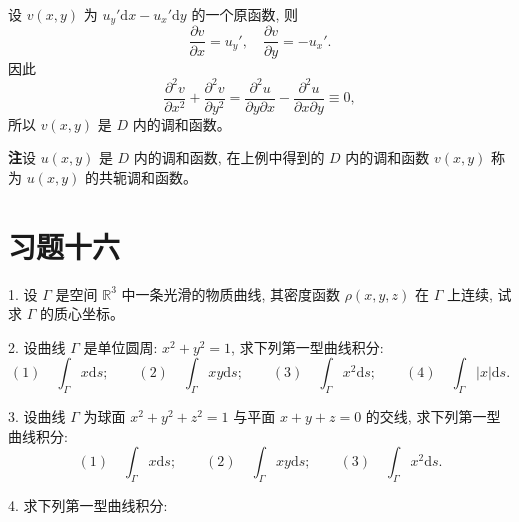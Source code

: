 \documentclass[UTF8,12pt,a4paper,fontset=fandol]{ctexart}
\begin{document}
设 $v(x,y)$ 为 $u_y'\mathrm dx-u_x'\mathrm dy$ 的一个原函数, 则
\[
  \frac{\partial v}{\partial x}=u_y',
  \quad
  \frac{\partial v}{\partial y}=-u_x'.
\]
因此
\[
  \frac{\partial^2v}{\partial x^2}+\frac{\partial^2v}{\partial y^2}
  =
  \frac{\partial^2u}{\partial y\partial x}
  -
  \frac{\partial^2u}{\partial x\partial y}
  \equiv0,
\]
所以 $v(x,y)$ 是 $D$ 内的调和函数。

\noindent\textbf{注}\quad 设 $u(x,y)$ 是 $D$ 内的调和函数, 在上例中得到的 $D$ 内的调和函数 $v(x,y)$ 称为 $u(x,y)$ 的共轭调和函数。

\section*{习题十六}

1. 设 $\Gamma$ 是空间 $\mathbb R^3$ 中一条光滑的物质曲线, 其密度函数 $\rho(x,y,z)$ 在 $\Gamma$ 上连续, 试求 $\Gamma$ 的质心坐标。

2. 设曲线 $\Gamma$ 是单位圆周: $x^2+y^2=1$, 求下列第一型曲线积分:
\[
  (1)\quad \int_\Gamma x\mathrm ds;\qquad
  (2)\quad \int_\Gamma xy\mathrm ds;\qquad
  (3)\quad \int_\Gamma x^2\mathrm ds;\qquad
  (4)\quad \int_\Gamma |x|\mathrm ds.
\]

3. 设曲线 $\Gamma$ 为球面 $x^2+y^2+z^2=1$ 与平面 $x+y+z=0$ 的交线, 求下列第一型曲线积分:
\[
  (1)\quad \int_\Gamma x\mathrm ds;\qquad
  (2)\quad \int_\Gamma xy\mathrm ds;\qquad
  (3)\quad \int_\Gamma x^2\mathrm ds.
\]

4. 求下列第一型曲线积分:
\end{document}
